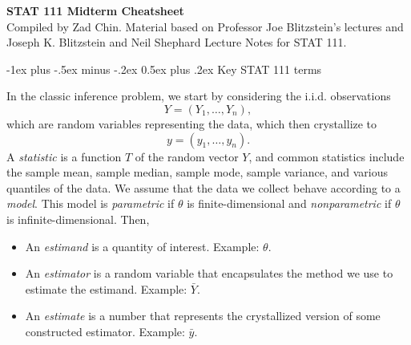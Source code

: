 \documentclass[10pt,landscape]{article}
\makeatletter
\renewcommand{\section}{\@startsection{section}{1}{0mm}%
                                {-1ex plus -.5ex minus -.2ex}%
                                {0.5ex plus .2ex}%
                                {\normalfont\large\bfseries}}
\makeatother
\begin{document}
\raggedright
\footnotesize
\begin{multicols*}{3}

\setlength{\premulticols}{1pt}
\setlength{\postmulticols}{1pt}
\setlength{\multicolsep}{1pt}
\setlength{\columnsep}{2pt}



    {\color{blue} \Large{\textbf{STAT 111 Midterm Cheatsheet}}} \\



\scriptsize
 Compiled by Zad Chin. Material based on Professor Joe Blitzstein's lectures and Joseph K. Blitzstein and Neil Shephard Lecture Notes for STAT 111.



\scriptsize




\section{Key STAT 111 terms} 

In the classic inference problem, we start by considering the i.i.d. observations $$Y=(Y_1,\dots,Y_n),$$ which are random variables representing the data, which then crystallize to $$y=(y_1,\dots,y_n).$$ A \emph{statistic} is a function $T$ of the random vector $Y$, and common statistics include the sample mean, sample median, sample mode, sample variance, and various quantiles of the data. We assume that the data we collect behave according to a \emph{model}. This model is \emph{parametric} if $\theta$ is finite-dimensional and \emph{nonparametric} if $\theta$ is infinite-dimensional. Then,
\begin{itemize}
    \item An \emph{estimand} is a quantity of interest. Example: $\theta$.
    \item An \emph{estimator} is a random variable that encapsulates the method we use to estimate the estimand. Example: $\bar{Y}$.
    \item An \emph{estimate} is a number that represents the crystallized version of some constructed estimator. Example: $\bar{y}$.
\end{itemize}



\end{multicols*}
\end{document}
